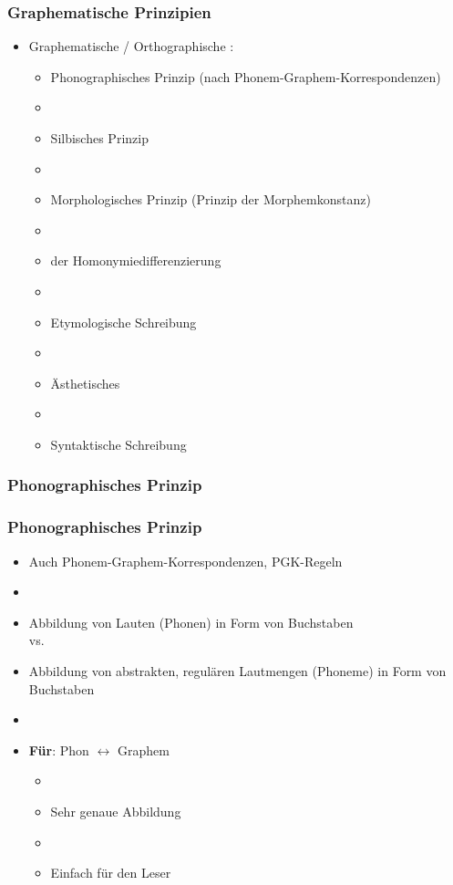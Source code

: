 \begin{frame}
\frametitle{Graphematische Prinzipien}

\begin{itemize}
	\item Graphematische / Orthographische :
	
	\begin{itemize}
		\item Phonographisches Prinzip (nach Phonem-Graphem-Korrespondenzen)
		\item[]
		\item Silbisches Prinzip
		\item[]
		\item Morphologisches Prinzip (Prinzip der Morphemkonstanz)
		\item[]
		\item {} der Homonymiedifferenzierung
		\item[]
		\item Etymologische Schreibung
		\item[]
		\item Ästhetisches 
		\item[]
		\item Syntaktische Schreibung
	\end{itemize}
\end{itemize}


\end{frame}


\subsubsection{Phonographisches Prinzip}


\begin{frame}
\frametitle{Phonographisches Prinzip}

\begin{itemize}
	\item Auch Phonem-Graphem-Korrespondenzen, PGK-Regeln
	\item[]
\pause	
	\item Abbildung von Lauten (Phonen) in Form von Buchstaben \\ vs.
	\item Abbildung von abstrakten, regulären Lautmengen (Phoneme) in
Form von Buchstaben
	\item[]
	\item \textbf{Für}: Phon $\leftrightarrow$ Graphem
	
	\begin{itemize}
		\item[]
		\item Sehr genaue Abbildung
		\item[]
		\item Einfach für den Leser
	\end{itemize}
\end{itemize}


\end{frame}



